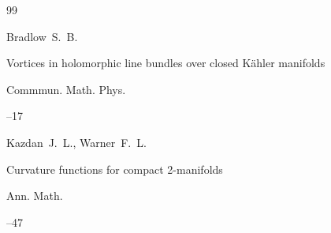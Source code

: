 \begin{thebibliography}{99}

\by Bradlow~S.~B. 

\paper Vortices in holomorphic line bundles over closed K\"ahler manifolds 

\jour Commmun. Math. Phys. 




--17





\by Kazdan~J.~L., Warner~F.~L. 

\paper Curvature functions for compact 2-manifolds 

\jour Ann. Math. 




--47










\end{thebibliography}



\EngDate



\renewcommand{\baselinestretch}{0.9}



\Russian

\newpage



%

